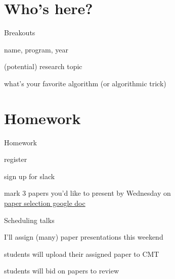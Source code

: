 \documentclass[presentation,xcolor={usenames,dvipsnames}]{beamer}
\begin{document}
\section{Who's here?}

\begin{frame}{Breakouts}

\bit
\item name, program, year
\item (potential) research topic
\item what's your favorite algorithm (or algorithmic trick)
\eit

\end{frame}

\section{Homework}

\begin{frame}{Homework}

\bit
\item register
\item sign up for slack
\item mark 3 papers you'd like to present by Wednesday on \\
\href{https://docs.google.com/spreadsheets/d/1dhp6D9WJpbvqckGtqw_cDgwzxyPobItjU80ZpkdjhWA}{paper selection google doc}
\eit

\end{frame}

\begin{frame}{Scheduling talks}

\bit
\item I'll assign (many) paper presentations this weekend
\item students will upload their assigned paper to CMT
\item students will bid on papers to review
\eit

\end{frame}
\end{document}
